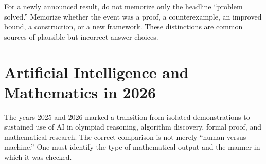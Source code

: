     \begin{strategy}
        For a newly announced result, do not memorize only the headline
        ``problem solved.'' Memorize whether the event was a proof, a
        counterexample, an improved bound, a construction, or a new framework.
        These distinctions are common sources of plausible but incorrect answer
        choices.
    \end{strategy}

    \chapter{Artificial Intelligence and Mathematics in 2026}

    The years 2025 and 2026 marked a transition from isolated demonstrations to
    sustained use of AI in olympiad reasoning, algorithm discovery, formal proof,
    and mathematical research. The correct comparison is not merely
    ``human versus machine.'' One must identify the type of mathematical output
    and the manner in which it was checked.

    \vspace{1em}

